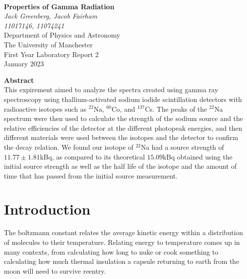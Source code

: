 \documentclass[12pt, a4paper]{article}
\begin{document}
\begin{center}

\noindent \\[10pt]
\color{black}

\thispagestyle{empty} %

\Large{\textbf{Properties of Gamma Radiation}} \\[30pt]
\normalsize \textit{Jack Greenberg, Jacob Fairham}\\[5pt]
\textit{11017146,  11074241}\\[20pt]
Department of Physics and Astronomy \\[5pt]
The University of Manchester \\[20pt]
First Year Laboratory Report 2 \\[20pt]
January 2023 \\[25pt]

\end{center}

\textbf{Abstract}\\[12pt]
This expirement aimed to analyze the spectra created using gamma ray spectroscopy using thallium-activated sodium iodide scintillation detectors with radioactive isotopes such as $^{22}$Na, $^{60}$Co, and $^{137}$Cs. The peaks of the $^{22}$Na spectrum were then used to calculate the strength of the sodium source and the relative efficiencies of the detector at the different photopeak energies, and then different materials were used between the isotopes and the detector to confirm the decay relation. We found our isotope of $^{22}$Na had a source strength of $11.77\pm1.81$kBq, as compared to its theoretical $15.09$kBq obtained using the initial source strength as well as the half life of the isotope and the amount of time that has passed from the initial source measurement.

\noindent 

\pagebreak

\section{Introduction}
		The boltzmann constant relates the average kinetic energy within a distribution of molecules to their temperature. Relating energy to temperature comes up in many contexts, from calculating how long to nuke or cook something to calculating how much thermal insulation a capsule returning to earth from the moon will need to survive reentry.
\end{document}
